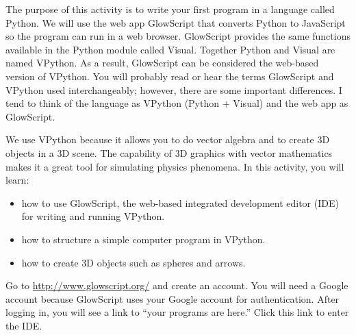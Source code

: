 
\apparatus
{}

\longgoal

The purpose of this activity is to write your first program in a language called Python. We will use the web app GlowScript that converts Python to JavaScript so the program can run in a web browser. GlowScript provides the same functions available in the Python module called Visual. Together Python and Visual are named VPython. As a result, GlowScript can be considered the web-based version of VPython. You will probably read or hear the terms GlowScript and VPython used interchangeably; however, there are some important differences. I tend to think of the language as VPython (Python + Visual) and the web app as GlowScript.

We use VPython because it allows you to do vector algebra and to create 3D objects in a 3D scene. The capability of 3D graphics with vector mathematics makes it a great tool for simulating physics phenomena. In this activity, you will learn:

\begin{itemize}
	\item how to use GlowScript, the web-based integrated development editor (IDE) for writing and running VPython.
	\item how to structure a simple computer program in VPython.
	\item how to create 3D objects such as spheres and arrows.
\end{itemize}

\setup

Go to \href{http://www.glowscript.org/}{http://www.glowscript.org/} and create an account. You will need a Google account because GlowScript uses your Google account for authentication. After logging in, you will see a link to ``your programs are here.'' Click this link to enter the IDE. 

\procedure

